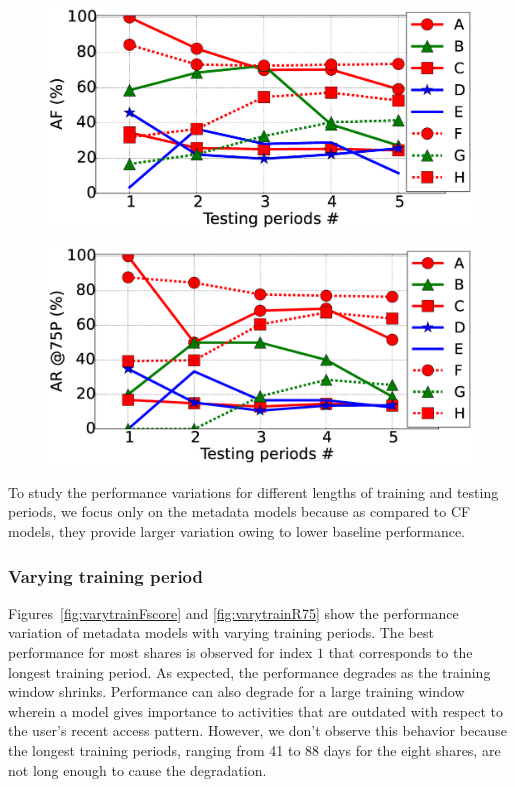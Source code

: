\begin{figure}
\centering
\begin{minipage}{.95\textwidth}
  \centering
  \includegraphics[width=0.65\linewidth]{FileAccess/figs/VaryTestFScore10}
  \label{fig:varytestFscore}
\end{minipage} %
\begin{minipage}{.95\textwidth}
  \centering
  \includegraphics[width=0.65\linewidth]{FileAccess/figs/VaryTestR7510}
  \label{fig:varytestR75}
\end{minipage}
\end{figure}
To study the performance variations for different lengths of training
and testing periods, we focus only on the metadata models because as
compared to CF models, they provide larger variation owing to lower
baseline performance.


\subsubsection{Varying training period}
Figures~\ref{fig:varytrainFscore} and \ref{fig:varytrainR75} show the
performance variation of metadata models with varying training
periods.  The best performance for most shares is observed for index
$1$ that corresponds to the longest training period.  As expected, the
performance degrades as the training window shrinks.  Performance can
also degrade for a large training window wherein a model gives
importance to activities that are outdated with respect to the user's
recent access pattern.  However, we don't observe this behavior
because the longest training periods, ranging from 41 to 88 days for
the eight shares, are not long enough to cause the degradation.

